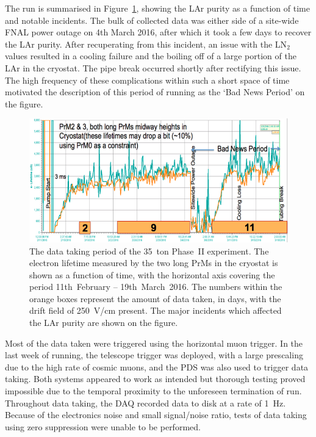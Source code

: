 The run is summarised in Figure~\ref{fig:35tonPhaseIIData}, showing the LAr purity as a function of time and notable incidents.  The bulk of collected data was either side of a site-wide FNAL power outage on 4th March 2016, after which it took a few days to recover the LAr purity.  After recuperating from this incident, an issue with the LN$_2$ values resulted in a cooling failure and the boiling off of a large portion of the LAr in the cryostat.  The pipe break occurred shortly after rectifying this issue.  The high frequency of these complications within such a short space of time motivated the description of this period of running as the `Bad News Period' on the figure.

\begin{figure}
  \centering
  \includegraphics[width=15cm]{35tonPhaseIIData.png}
  \caption[The data taking period of the 35~ton Phase~II experiment.]{The data taking period of the 35~ton Phase~II experiment.  The electron lifetime measured by the two long PrMs in the cryostat is shown as a function of time, with the horizontal axis covering the period 11th~February -- 19th~March~2016.  The numbers within the orange boxes represent the amount of data taken, in days, with the drift field of 250~V/cm present.  The major incidents which affected the LAr purity are shown on the figure.}
  \label{fig:35tonPhaseIIData}
\end{figure}

Most of the data taken were triggered using the horizontal muon trigger.  In the last week of running, the telescope trigger was deployed, with a large prescaling due to the high rate of cosmic muons, and the PDS was also used to trigger data taking.  Both systems appeared to work as intended but thorough testing proved impossible due to the temporal proximity to the unforeseen termination of run.  Throughout data taking, the DAQ recorded data to disk at a rate of 1~Hz.  Because of the electronics noise and small signal/noise ratio, tests of data taking using zero suppression were unable to be performed.

